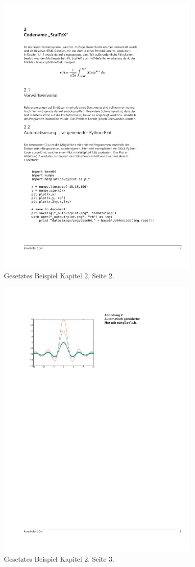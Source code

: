 \begin{figure}[h!]
  \centering
    \includegraphics[width=0.9\textwidth]{figures/dsl_skript_2.pdf}
  \caption{Gesetztes Beispiel Kapitel 2, Seite 2.}\label{fig-dsl_skript_2}
\end{figure}

\begin{figure}[h!]
  \centering
    \includegraphics[width=0.9\textwidth]{figures/dsl_skript_3.pdf}
  \caption{Gesetztes Beispiel Kapitel 2, Seite 3.}\label{fig-dsl_skript_3}
\end{figure}

